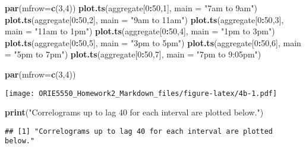 \documentclass[
]{article}
\newenvironment{Shaded}{\begin{snugshade}}{\end{snugshade}}
\newcommand{\AttributeTok}[1]{\textcolor[rgb]{0.13,0.29,0.53}{#1}}
\newcommand{\DecValTok}[1]{\textcolor[rgb]{0.00,0.00,0.81}{#1}}
\newcommand{\FunctionTok}[1]{\textcolor[rgb]{0.13,0.29,0.53}{\textbf{#1}}}
\newcommand{\NormalTok}[1]{#1}
\newcommand{\SpecialCharTok}[1]{\textcolor[rgb]{0.81,0.36,0.00}{\textbf{#1}}}
\newcommand{\StringTok}[1]{\textcolor[rgb]{0.31,0.60,0.02}{#1}}
\begin{document}
\begin{Shaded}
\begin{Highlighting}[]
\FunctionTok{par}\NormalTok{(}\AttributeTok{mfrow=}\FunctionTok{c}\NormalTok{(}\DecValTok{3}\NormalTok{,}\DecValTok{4}\NormalTok{))}
\FunctionTok{plot.ts}\NormalTok{(aggregate[}\DecValTok{0}\SpecialCharTok{:}\DecValTok{50}\NormalTok{,}\DecValTok{1}\NormalTok{], }\AttributeTok{main =} \StringTok{"7am to 9am"}\NormalTok{)}
\FunctionTok{plot.ts}\NormalTok{(aggregate[}\DecValTok{0}\SpecialCharTok{:}\DecValTok{50}\NormalTok{,}\DecValTok{2}\NormalTok{], }\AttributeTok{main =} \StringTok{"9am to 11am"}\NormalTok{)}
\FunctionTok{plot.ts}\NormalTok{(aggregate[}\DecValTok{0}\SpecialCharTok{:}\DecValTok{50}\NormalTok{,}\DecValTok{3}\NormalTok{], }\AttributeTok{main =} \StringTok{"11am to 1pm"}\NormalTok{)}
\FunctionTok{plot.ts}\NormalTok{(aggregate[}\DecValTok{0}\SpecialCharTok{:}\DecValTok{50}\NormalTok{,}\DecValTok{4}\NormalTok{], }\AttributeTok{main =} \StringTok{"1pm to 3pm"}\NormalTok{)}
\FunctionTok{plot.ts}\NormalTok{(aggregate[}\DecValTok{0}\SpecialCharTok{:}\DecValTok{50}\NormalTok{,}\DecValTok{5}\NormalTok{], }\AttributeTok{main =} \StringTok{"3pm to 5pm"}\NormalTok{)}
\FunctionTok{plot.ts}\NormalTok{(aggregate[}\DecValTok{0}\SpecialCharTok{:}\DecValTok{50}\NormalTok{,}\DecValTok{6}\NormalTok{], }\AttributeTok{main =} \StringTok{"5pm to 7pm"}\NormalTok{)}
\FunctionTok{plot.ts}\NormalTok{(aggregate[}\DecValTok{0}\SpecialCharTok{:}\DecValTok{50}\NormalTok{,}\DecValTok{7}\NormalTok{], }\AttributeTok{main =} \StringTok{"7pm to 9:05pm"}\NormalTok{)}


\FunctionTok{par}\NormalTok{(}\AttributeTok{mfrow=}\FunctionTok{c}\NormalTok{(}\DecValTok{3}\NormalTok{,}\DecValTok{4}\NormalTok{))}
\end{Highlighting}
\end{Shaded}

\texttt{[image: ORIE5550\_Homework2\_Markdown\_files/figure-latex/4b-1.pdf]}

\begin{Shaded}
\begin{Highlighting}[]
\FunctionTok{print}\NormalTok{(}\StringTok{"Correlograms up to lag 40 for each interval are plotted below."}\NormalTok{)}
\end{Highlighting}
\end{Shaded}

\begin{verbatim}
## [1] "Correlograms up to lag 40 for each interval are plotted below."
\end{verbatim}
\end{document}

